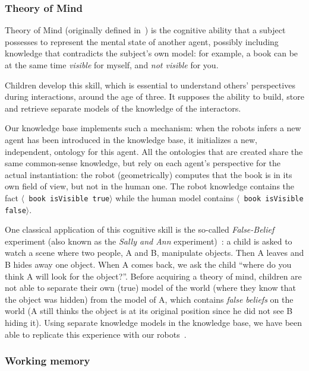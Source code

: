 \documentclass[preprint,3p,times]{elsarticle}
\newcommand{\stmt}[1]{{\footnotesize \tt $\langle$ #1\relax$\rangle$}}
\begin{document}
\subsubsection{Theory of Mind}
\label{sect|tom}

Theory of Mind (originally defined in~\cite{Premack1978}) is the cognitive
ability that a subject possesses to represent the mental state of another
agent, possibly including knowledge that contradicts the subject's own model: for
example, a book can be at the same time \emph{visible} for myself, and \emph{not
visible} for you.

Children develop this skill, which is essential to understand others' perspectives during
interactions, around the age of three. It supposes the
ability to build, store and retrieve separate models of the knowledge of the
interactors.

Our knowledge base implements such a mechanism: when the robots infers a new
agent has been introduced in the knowledge base, it initializes a new,
independent, ontology for this agent. All the ontologies that are created share
the same common-sense knowledge, but rely on each agent's perspective for the
actual instantiation: the robot (geometrically) computes that the book is in
its own field of view, but not in the human one. The robot knowledge contains
the fact \stmt{book isVisible true} while the human model contains \stmt{book
isVisible false}.

One classical application of this cognitive skill is the so-called
\emph{False-Belief} experiment (also known as the \emph{Sally and Ann}
experiment)~\cite{Leslie2000}: a child is asked to watch a scene where two
people, A and B, manipulate objects. Then A leaves and B hides away one
object. When A comes back, we ask the child ``where do you think A will
look for the object?''. Before acquiring a theory of mind, children are not
able to separate their own (true) model of the world (where they know that
the object was hidden) from the model of A, which contains \emph{false
beliefs} on the world (A still thinks the object is at its original
position since he did not see B hiding it). Using separate knowledge models
in the knowledge base, we have been able to replicate this experience with
our robots~\cite{warnier2012when}.

\subsubsection{Working memory}
\end{document}
